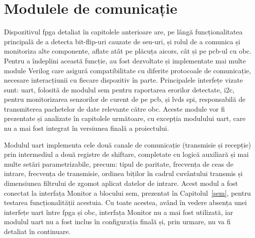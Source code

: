 \documentclass[12pt,a4paper]{report}
\begin{document}
\section{Modulele de comunicație}
Dispozitivul \gls{fpga} detaliat în capitolele anterioare are, pe lângă funcționalitatea principală de a detecta bit-flip-uri cauzate de \gls{seu}-uri, și rolul de a comunica și monitoriza alte componente, aflate atât pe plăcuța \gls{aicors}, cât și pe \gls{pcb}-ul cu \gls{obc}. Pentru a îndeplini această funcție, au fost dezvoltate și implementate mai multe module Verilog care asigură compatibilitate cu diferite protocoale de comunicație, necesare interacțiunii cu fiecare dispozitiv în parte. Principalele interfețe vizate sunt: \gls{uart}, folosită de modulul \gls{sem} pentru raportarea erorilor detectate, \gls{i2c}, pentru monitorizarea senzorilor de curent de pe \gls{pcb}, și \gls{lvds} \gls{spi}, responsabilă de transmiterea pachetelor de date relevante către \gls{obc}. Aceste module vor fi prezentate și analizate în capitolele următoare, cu excepția modulului \gls{uart}, care nu a mai fost integrat în versiunea finală a proiectului.

Modulul \gls{uart} implementa cele două canale de comunicație (transmisie și recepție) prin intermediul a două registre de shiftare, completate cu logică auxiliară și mai multe setări parametrizabile, precum: tipul de paritate, frecvența de ceas de intrare, frecvența de transmisie, ordinea biților în cadrul cuvântului transmis și dimensiunea filtrului de zgomot aplicat datelor de intrare. Acest modul a fost conectat la interfața Monitor a blocului \gls{sem}, prezentat în Capitolul~\ref{sem}, pentru testarea funcționalității acestuia. Cu toate acestea, având în vedere absența unei interfețe \gls{uart} între \gls{fpga} și \gls{obc}, interfața Monitor nu a mai fost utilizată, iar modulul \gls{uart} nu a fost inclus în configurația finală și, prin urmare, nu va fi detaliat în continuare.
\end{document}
